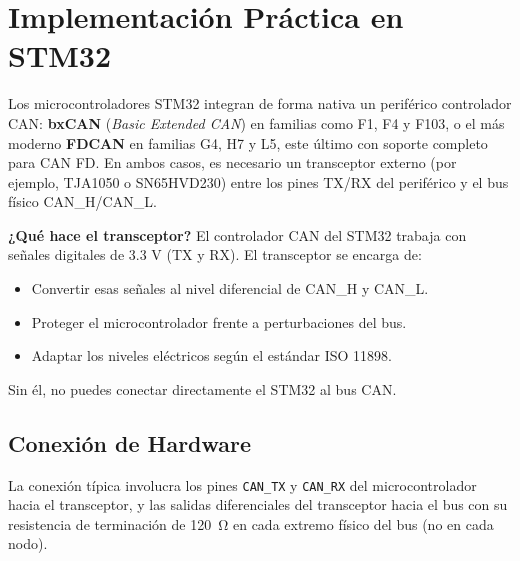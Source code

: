 \documentclass[pdflatex,sn-mathphys-num]{sn-jnl}%
\begin{document}
\section{Implementación Práctica en STM32}\label{sec:implementation}
Los microcontroladores STM32 integran de forma nativa un periférico controlador CAN: \textbf{bxCAN} (\textit{Basic Extended CAN}) en familias como F1, F4 y F103, o el más moderno \textbf{FDCAN} en familias G4, H7 y L5, este último con soporte completo para CAN FD. En ambos casos, es necesario un transceptor externo (por ejemplo, TJA1050 o SN65HVD230) entre los pines TX/RX del periférico y el bus físico CAN\_H/CAN\_L.

\textbf{¿Qué hace el transceptor?}
El controlador CAN del STM32 trabaja con señales digitales de 3.3 V (TX y RX). El transceptor se encarga de:
\begin{itemize}
    \item Convertir esas señales al nivel diferencial de CAN\_H y CAN\_L.
    \item Proteger el microcontrolador frente a perturbaciones del bus.
    \item Adaptar los niveles eléctricos según el estándar ISO 11898.
\end{itemize}

Sin él, no puedes conectar directamente el STM32 al bus CAN.
\subsection{Conexión de Hardware}
La conexión típica involucra los pines \texttt{CAN\_TX} y \texttt{CAN\_RX} del microcontrolador hacia el transceptor, y las salidas diferenciales del transceptor hacia el bus con su resistencia de terminación de \SI{120}{\ohm} en cada extremo físico del bus (no en cada nodo).

\end{document}

